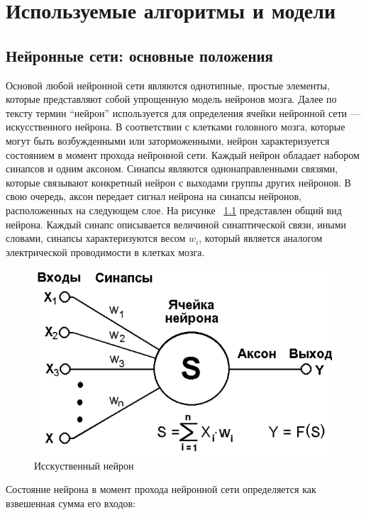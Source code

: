 \documentclass[a4paper,english,russian]{G2-105}
\begin{document}
\chapter{Используемые алгоритмы и модели}
\section{Нейронные сети: основные положения}
\par Основой любой нейронной сети являются однотипные, простые элементы, которые представляют собой упрощенную модель нейронов мозга. Далее по тексту термин “нейрон” используется для определения ячейки нейронной сети --- искусственного нейрона. В соответствии с клетками головного мозга, которые могут быть возбужденными или заторможенными, нейрон характеризуется состоянием в момент прохода нейронной сети. Каждый нейрон обладает набором синапсов и одним аксоном. Синапсы являются однонаправленными связями, которые связывают конкретный нейрон с выходами группы других нейронов. В свою очередь, аксон передает сигнал нейрона на синапсы нейронов, расположенных на следующем слое. На рисунке ~\ref{neuron} представлен общий вид нейрона. Каждый синапс описывается величиной синаптической связи, иными словами, синапсы характеризуются весом $w_i$, который является аналогом электрической проводимости в клетках мозга.
\begin{figure}
\begin{center}
    \includegraphics[width=0.6\linewidth]{neuron.png}
    \caption{Исскуственный нейрон}
	\label{neuron}
\end{center}
\end{figure}
\par Состояние нейрона в момент прохода нейронной сети определяется как взвешенная сумма его входов:
\end{document}
